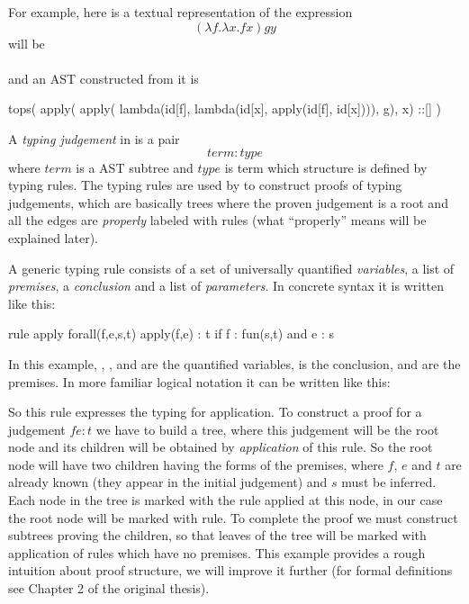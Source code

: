 For example, here is a textual representation of the expression
$$(\lambda f.\lambda x. f x) g y$$
will be\\
\\
and an AST constructed from it is
\begin{code}
tops(
    apply(
        apply(
            lambda(id[f], 
                lambda(id[x], 
                    apply(id[f], id[x]))),
            g),
        x)
    ::[]
)
\end{code}

A \emph{typing judgement} in \Tcg{} is a pair 
$$term : type$$
where $term$ is a AST subtree and $type$ is term which structure is defined by typing rules. The typing rules are used by \Tcg{} to construct proofs of typing judgements, which are basically trees where the proven judgement is a root and all the edges are \emph{properly} labeled with rules (what ``properly'' means will be explained later). 

A generic typing rule consists of a set of universally quantified \emph{variables}, a list of \emph{premises}, a \emph{conclusion} and a list of \emph{parameters}. In \Tcg{} concrete syntax it is written like this:
\begin{code}
rule apply
  forall(f,e,s,t)
    apply(f,e) : t
  if f : fun(s,t)
  and e : s
\end{code}

In this example, , ,  and  are the quantified variables,  is the conclusion,  and  are the premises. In more familiar logical notation it can be written like this:

So this rule expresses the typing for application. To construct a proof for a judgement $f e : t$ we have to build a tree, where this judgement will be the root node and its children will be obtained by \emph{application} of this rule. So the root node will have two children having the forms of the premises, where $f$, $e$ and $t$ are already known (they appear in the initial judgement) and $s$ must be inferred. Each node in the tree is marked with the rule applied at this node, in our case the root node will be marked with  rule. To complete the proof we must construct subtrees proving the children, so that leaves of the tree will be marked with application of rules which have no premises. This example provides a rough intuition about proof structure, we will improve it further (for formal definitions see Chapter 2 of the original thesis).

